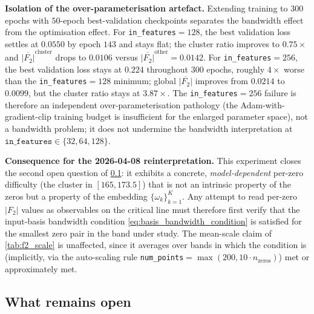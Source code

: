 \documentclass[11pt, a4paper]{article}
\theoremstyle{definition}
\theoremstyle{plain}
\begin{document}
\smallskip
\noindent\textbf{Isolation of the over-parameterisation
artefact.} Extending training to $300$ epochs with $50$-epoch
best-validation checkpoints separates the bandwidth effect
from the optimisation effect. For
\texttt{in\_features}$=128$, the best validation loss settles
at $0.0550$ by epoch $143$ and stays flat; the cluster ratio
improves to $0.75\times$ and $\overline{|F_2|}^{\mathrm{cluster}}$
drops to $0.0106$ versus $\overline{|F_2|}^{\mathrm{other}}
=0.0142$. For \texttt{in\_features}$=256$, the best validation
loss stays at $0.224$ throughout $300$ epochs, roughly $4\times$
worse than the \texttt{in\_features}$=128$ minimum; global
$\overline{|F_2|}$ improves from $0.0214$ to $0.0099$, but the
cluster ratio stays at $3.87\times$. The
\texttt{in\_features}$=256$ failure is therefore an independent
over-parameterisation pathology (the Adam-with-gradient-clip
training budget is insufficient for the enlarged parameter
space), not a bandwidth problem; it does not undermine the
bandwidth interpretation at $\texttt{in\_features}\in\{32,64,128\}$.

\smallskip
\noindent\textbf{Consequence for the 2026-04-08 reinterpretation.}
This experiment closes the second open question of
\cref{sec:f2_residual_open}: it exhibits a concrete,
\emph{model-dependent} per-zero difficulty (the cluster in
$[165,173.5]$) that is not an intrinsic property of the zeros
but a property of the embedding $\{\omega_k\}_{k=1}^{K}$. Any
attempt to read per-zero $|F_2|$ values as observables on the
critical line must therefore first verify that the input-basis
bandwidth condition \eqref{eq:basis_bandwidth_condition} is
satisfied for the smallest zero pair in the band under study.
The mean-scale claim of \cref{tab:f2_scale} is unaffected,
since it averages over bands in which the condition is
(implicitly, via the auto-scaling rule
\texttt{num\_points}$=\max(200,10\cdot n_{\mathrm{zeros}})$)
met or approximately met.

\subsection{What remains open}
\label{sec:f2_residual_open}
\end{document}
